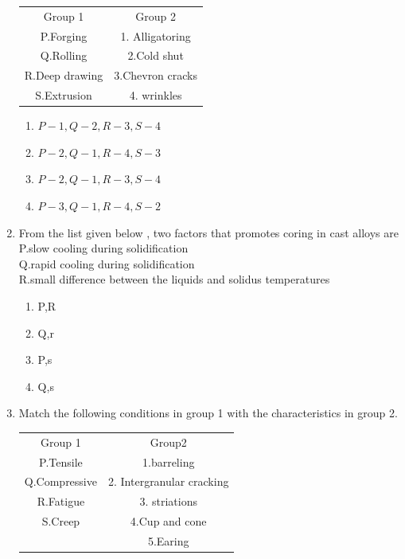 \documentclass[journal]{IEEEtran}
\theoremstyle{remark}
\begin{document}
\begin{enumerate}
\begin{center}
\begin{tabular}{c c}
Group 1 & Group 2 \\ 
P.Forging & 1. Alligatoring\\
Q.Rolling & 2.Cold shut\\
R.Deep drawing & 3.Chevron cracks\\
S.Extrusion &  4. wrinkles
\end{tabular}
\end{center}
\begin{multicols}{2}
\begin{enumerate}
    \item$ P-1,Q-2,R-3,S-4$
    \item$P-2,Q-1,R-4,S-3$
    \item $P-2,Q-1,R-3,S-4$
    \item $P-3,Q-1,R-4,S-2$
\end{enumerate}
\end{multicols}
\item From the list given below , two factors that promotes coring in cast alloys are                \hfill{}\\
P.slow cooling during solidification \\
Q.rapid cooling during solidification\\
R.small difference between the liquids and solidus temperatures\\
\begin{multicols}{4}
\begin{enumerate}
    \item P,R
    \item Q,r
    \item P,s
    \item Q,s
\end{enumerate}
\end{multicols}
\item Match the following conditions in group 1 with the characteristics in group 2.\hfill{}
\begin{center}
\begin{tabular}{c c}
Group 1     &Group2  \\
P.Tensile     &1.barreling\\
Q.Compressive &2. Intergranular cracking\\
R.Fatigue &3. striations\\
S.Creep &4.Cup and cone\\
       &5.Earing
\end{tabular}
\end{center}
\begin{multicols}{2}

\end{multicols}
\end{enumerate}
\end{document}

